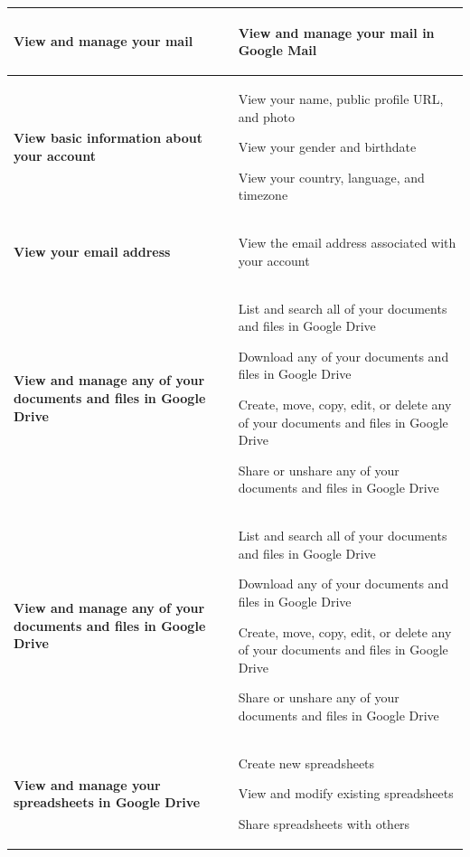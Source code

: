 \begin{center}
\begin{longtable}{ | p{5cm} | p{8cm} | }
	\textbf{View and manage your mail} & 
	\begin{compactitem}
		\item View and manage your mail in Google Mail
	\end{compactitem} \\ \hline
	\textbf{View basic information about your account} &
	\begin{compactitem}
		\item View your name, public profile URL, and photo
		\item View your gender and birthdate
		\item View your country, language, and timezone
	\end{compactitem} \\ \hline
	\textbf{View your email address} &
	\begin{compactitem}
		\item View the email address associated with your account
	\end{compactitem} \\ \hline
	\textbf{View and manage any of your documents and files in Google Drive} &
	\begin{compactitem}
		\item List and search all of your documents and files in Google Drive
		\item Download any of your documents and files in Google Drive
		\item Create, move, copy, edit, or delete any of your documents and files in Google Drive
		\item Share or unshare any of your documents and files in Google Drive
	\end{compactitem} \\ \hline
	\textbf{View and manage any of your documents and files in Google Drive} &
	\begin{compactitem}
		\item List and search all of your documents and files in Google Drive
		\item Download any of your documents and files in Google Drive
		\item Create, move, copy, edit, or delete any of your documents and files in Google Drive
		\item Share or unshare any of your documents and files in Google Drive
	\end{compactitem} \\ \hline
	\textbf{View and manage your spreadsheets in Google Drive} &
	\begin{compactitem}
		\item Create new spreadsheets
		\item View and modify existing spreadsheets
		\item Share spreadsheets with others
	\end{compactitem} \\ \hline	
    \end{longtable}
\end{center}